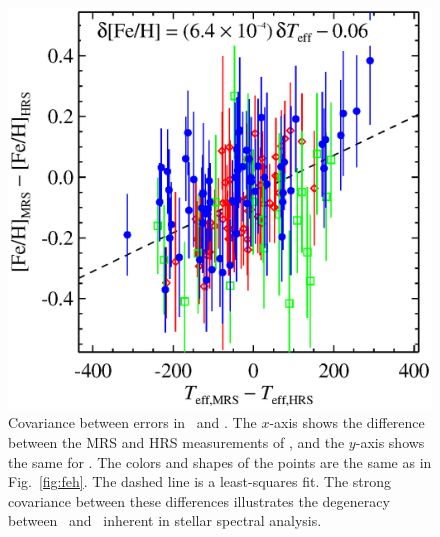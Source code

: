 \documentclass{emulateapj}
\begin{document}
\begin{figure}[p]
\centering
\begin{minipage}[t]{0.49\textwidth}
\centering
\includegraphics[width=\textwidth]{covar_teff_feh.eps}
\caption{Covariance between errors in \teff\ and \feh.  The $x$-axis
  shows the difference between the MRS and HRS measurements of \teff,
  and the $y$-axis shows the same for \feh.  The colors and shapes of
  the points are the same as in Fig.~\ref{fig:feh}.  The dashed line
  is a least-squares fit.  The strong covariance between these
  differences illustrates the degeneracy between \teff\ and
  \feh\ inherent in stellar spectral analysis.\label{fig:covartefffeh}}
\end{minipage}
\hfill
\begin{minipage}[t]{0.49\textwidth}
\centering

\end{minipage}
\end{figure}
\end{document}
